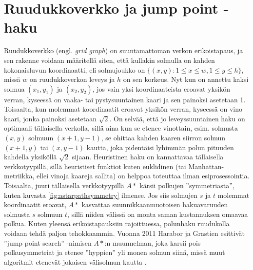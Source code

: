 \documentclass[finnish]{tktltiki2}
\theoremstyle{definition}
\theoremstyle{remark}
\begin{document}
\section{Ruudukkoverkko ja jump point -haku}
Ruudukkoverkko (engl. \textit{grid graph}) on suuntamattoman verkon erikoistapaus, ja sen rakenne voidaan määritellä siten, että kullakin solmulla on kahden kokonaisluvun koordinaatti, eli solmujoukko on $\{ (x, y) \colon 1 \leq x \leq w, 1 \leq y \leq h \}$, missä $w$ on ruudukkoverkon leveys ja $h$ on sen korkeus. Nyt kun on annettu kaksi solmua $(x_1, y_1)$ ja $(x_2, y_2)$, jos vain yksi koordinaateista eroavat yksikön verran, kyseessä on vaaka- tai pystysuuntainen kaari ja sen painoksi asetetaan 1. Toisaalta, kun molemmat koordinaatit eroavat yksikön verran, kyseessä on vino kaari, jonka painoksi asetetaan $\sqrt{2}$. On selvää, että jo leveyssuuntainen haku on optimaali tällaisella verkolla, sillä aina kun se etenee vinottain, esim. solmusta $(x, y)$ solmuun $(x + 1, y - 1)$, se ohittaa kahden kaaren siirron solmun $(x + 1, y)$ tai $(x, y - 1)$ kautta, joka pidentäisi lyhimmän polun pituuden kahdella yksiköllä $\sqrt{2}$ sijaan. Heuristinen haku on kannattavaa tällaisella verkkotyypillä, sillä heuristiset funktiot kuten euklidinen (tai Manhattan-metriikka, ellei vinoja kaareja sallita) on helppoa toteuttaa ilman esiprosessointia. Toisaalta, juuri tällaisella verkkotyypillä $A\ast$ kärsii polkujen ''symmetriasta'', kuten kuvasta \ref{fig:astarpathsymmetry} ilmenee. Jos siis solmujen $s$ ja $t$ molemmat koordinaatit eroavat, $A\ast$ kasvattaa suunnikkaanmuotoisen hakuavaruuden solmusta $s$ solmuun $t$, sillä niiden välissä on monta saman kustannuksen omaavaa polkua. Kuten yleensä erikoistapauksiin rajoittuessa, polunhaku ruudukolla voidaan tehdä paljon tehokkaammin. Vuonna 2011 Harabor ja Grastien esittivät ''jump point search'' -nimisen $A\ast$:n muunnelman, joka karsii pois polkusymmetriat ja etenee ''hyppien'' yli monen solmun siinä, missä muut algoritmit etenevät jokaisen välisolmun kautta \cite{Harabor11}.
\end{document}
